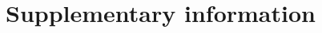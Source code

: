 \documentclass[oneside, a4paper, onecolumn, 11pt]{article}
\begin{document}
 \printbibliography






\clearpage
\appendix
\setcounter{subsection}{0}
\renewcommand{\thesection}{S\arabic{section}}
\setcounter{table}{0}
\renewcommand{\thetable}{S\arabic{table}}
\setcounter{figure}{0}
\renewcommand{\thefigure}{S\arabic{figure}}
\setcounter{equation}{0}
\renewcommand{\theequation}{S\arabic{equation}}

\section*{Supplementary information}
\end{document}
